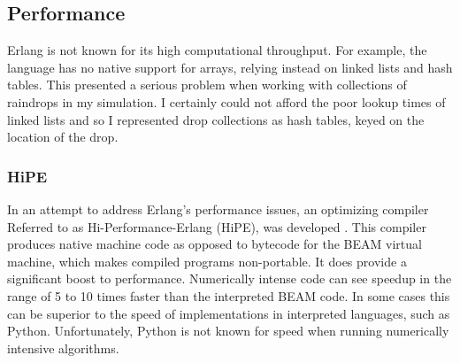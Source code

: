 \documentclass[twocolumn,a4paper,10pt]{article}
\begin{document}
\subsection{Performance}

Erlang is not known for its high computational throughput. For
example, the language has no native support for arrays, relying instead on
linked lists and hash tables. This presented a serious problem when working with
collections of raindrops in my simulation. I certainly could not afford the poor
lookup times of linked lists and so I represented drop collections as hash
tables, keyed on the location of the drop.

\subsubsection{HiPE}

In an attempt to address Erlang's performance issues, an optimizing compiler
Referred to as Hi-Performance-Erlang (HiPE), was developed \cite{hipe}. This
compiler produces native machine code as opposed to bytecode for the BEAM
virtual machine, which makes compiled programs non-portable. It does provide a
significant boost to performance. Numerically intense code can see speedup in
the range of 5 to 10 times faster than the interpreted BEAM code. In some cases
this can be superior to the speed of implementations in interpreted languages,
such as Python. Unfortunately, Python is not known for speed when running
numerically intensive algorithms.









\clearpage
\nocite{*}


\end{document}
